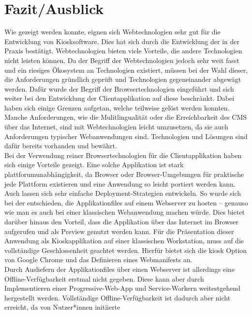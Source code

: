 \chapter{Fazit/Ausblick}
\label{chap:fazit}

Wie gezeigt werden konnte, eignen sich Webtechnologien sehr gut für
die Entwicklung von Kiosksoftware. Dies hat sich durch die Entwicklung
der \shst{} in der Praxis bestätigt. Webtechnologien bieten viele Vorteile, die andere
Technologien nicht leisten können. Da der Begriff der Webtechnologien jedoch
sehr weit fasst und ein riesiges Ökosystem an Technologien existiert, müssen bei
der Wahl dieser, die Anforderungen gründlich geprüft und Technologien gegeneinander 
abgewägt werden. Dafür wurde der Begriff der Browsertechnologien eingeführt und sich
weiter bei den Entwicklung der Clientapplikation auf diese beschränkt. 
Dabei haben sich einige Grenzen aufgetan, welche teilweise gelöst werden konnten.\\
Manche Anforderungen, wie die Mulitlingualität oder die Erreichbarkeit des CMS über das Internet,
sind mit Webtechnologien leicht umzusetzen, da sie auch Anforderungen typischer Webanwendungen sind.
Technologien und Lösungen sind dafür bereits vorhanden und bewährt.\\
Bei der Verwendung reiner Browsertechnologien für die Clientapplikation haben sich einige Vorteile 
gezeigt. Eine solche Applikation ist stark plattforumunabhängigkeit, da Browser oder Browser-Umgebungen
für praktische jede Plattform existieren und eine Anwendung so leicht portiert werden kann. Auch lassen
sich sehr einfache Deployment-Strategien entwickeln. So wurde sich bei der \shst{} entschieden, die
Applikationfiles auf einem Webserver zu hosten -- genauso wie man es auch bei einer klassischen %
Webanwendung machen würde. Dies bietet darüber hinaus den Vorteil, dass die Applikation über das Internet
im Browser aufgerufen und als Preview genutzt werden kann. Für die Präsentation dieser Anwendung als
Kioskapplikation auf einer klassischen Workstation, muss auf die vollständige Geschlossenheit geachtet werden.
Hierfür bietet sich die kiosk Option von Google Chrome und das Definieren eines Webmanifests an.\\
Durch Ausliefern der Applikationfiles über einen Webserver ist allerdings eine Offline-Verfügbarkeit
erstmal nicht gegeben. Diese kann aber durch Implementieren einer Progressive-Web-App und 
Service-Workern weitestgehend hergestellt werden.
Vollständige Offline-Verfügbarkeit ist dadurch aber nicht erreicht, da von Nutzer*innen initiierte
